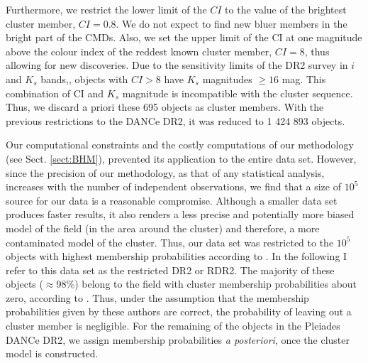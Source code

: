 Furthermore, we restrict the lower limit of the $CI$ to the value of the brightest cluster member, $CI =0.8$. We do not expect to find new bluer members in the bright part of the CMDs. Also, we set the upper limit of the CI at one magnitude above the colour index of the reddest known cluster member, $CI=8$, thus allowing for new discoveries. Due to the sensitivity limits of the DR2 survey in $i$ and $K_s$ bands,\cite[$i\approx23$ mag and $K_s\approx18$ mag, see Appendix A of][]{Bouy2015}, objects with $CI>8$ have $K_s$ magnitudes $\geq 16$ mag. This combination of CI and $K_s$ magnitude is incompatible with the cluster sequence. Thus, we discard a priori these 695 objects as cluster members. With the previous restrictions to the DANCe DR2, it was reduced to 1 424 893 objects.


Our computational constraints and the costly computations of our methodology (see Sect. \ref{sect:BHM}), prevented its application to the entire data set. However, since the precision of our methodology, as that of any statistical analysis, increases with the number of independent observations, we find that a size of $10^5$ source for our data is a reasonable compromise. Although a smaller data set produces faster results, it also renders a less precise and potentially more biased model of the field (in the area around the cluster) and therefore, a more contaminated model of the cluster. Thus, our data set was restricted to the $10^5$ objects with highest membership probabilities according to \citet{Bouy2015}. In the following I refer to this data set as the restricted DR2 or RDR2. The majority of these objects ($\approx$98\%) belong to the field with cluster membership probabilities about zero, according to \citet{Sarro2014,Bouy2015}. Thus, under the assumption that the membership probabilities given by these authors are correct, the probability of leaving out a cluster member is negligible. For the remaining of the objects in the Pleiades DANCe DR2, we assign membership probabilities \emph{a posteriori}, once the cluster model is constructed. 



